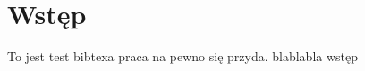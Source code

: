 \chapter{Wstęp}
To jest test bibtexa \cite{DBLP:journals/corr/OchoaVDT14} praca \cite{DBLP:conf/evoW/ThomsonOV19} na pewno się przyda.
blablabla wstęp \cite{DBLP:conf/depcos/BozejkoGNAB18}